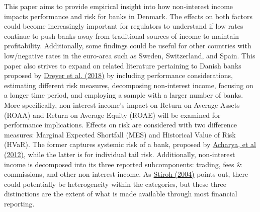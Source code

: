 \documentclass[10pt]{article} %
\begin{document}
This paper aims to provide empirical insight into how non-interest income impacts performance and risk for banks in Denmark. The effects on both factors could become increasingly important for regulators to understand if low rates continue to push banks away from traditional sources of income to maintain profitability. Additionally, some findings could be useful for other countries with low/negative rates in the euro-area such as Sweden, Switzerland, and Spain. This paper also strives to expand on related literature pertaining to Danish banks proposed by \hyperlink{Dreyer}{Dreyer et al. (2018)} by including performance considerations, estimating different risk measures, decomposing non-interest income, focusing on a longer time period, and employing a sample with a larger number of banks. More specifically, non-interest income's impact on Return on Average Assets (ROAA) and Return on Average Equity (ROAE) will be examined for performance implications. Effects on risk are considered with two difference measures: Marginal Expected Shortfall (MES) and Historical Value of Risk (HVaR). The former captures systemic risk of a bank, proposed by \hyperlink{Acharya}{Acharya, et al (2012)},  while the latter is for individual tail risk. Additionally, non-interest income is decomposed into its three reported subcomponents: trading, fees \& commissions, and other non-interest income. As \hyperlink{Stiroh}{Stiroh (2004)} points out, there could potentially be heterogeneity within the categories, but these three distinctions are the extent of what is made available through most financial reporting.
\end{document}
